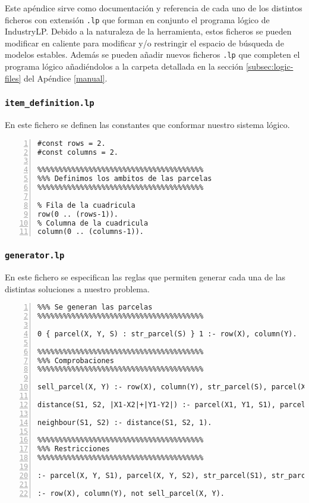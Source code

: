 Este apéndice sirve como documentación y referencia de cada uno de los distintos ficheros con extensión \texttt{.lp} que forman en conjunto el programa lógico de IndustryLP. Debido a la naturaleza de la herramienta, estos ficheros se pueden modificar en caliente para modificar y/o restringir el espacio de búsqueda de modelos estables. Además se pueden añadir nuevos ficheros \texttt{.lp} que completen el programa lógico añadiéndolos a la carpeta detallada en la sección \ref{subsec:logic-files} del Apéndice \ref{manual}.

\subsubsection{\large\texttt{item\_definition.lp}}

En este fichero se definen las constantes que conformar nuestro sistema lógico.

\begin{lstlisting}[basicstyle=\ttfamily, numberstyle={\color[rgb]{0.25, 0.25, 0.25}\ttfamily}, numbers=left]
#const rows = 2.
#const columns = 2.

%%%%%%%%%%%%%%%%%%%%%%%%%%%%%%%%%%%%%%%
%%% Definimos los ambitos de las parcelas
%%%%%%%%%%%%%%%%%%%%%%%%%%%%%%%%%%%%%%%

% Fila de la cuadricula
row(0 .. (rows-1)).
% Columna de la cuadricula
column(0 .. (columns-1)).
\end{lstlisting}

\subsubsection{\large\texttt{generator.lp}}

En este fichero se especifican las reglas que permiten generar cada una de las distintas soluciones a nuestro problema.

\begin{lstlisting}[basicstyle=\ttfamily, numberstyle={\color[rgb]{0.25, 0.25, 0.25}\ttfamily}, numbers=left]
%%%%%%%%%%%%%%%%%%%%%%%%%%%%%%%%%%%%%%%
%%% Se generan las parcelas
%%%%%%%%%%%%%%%%%%%%%%%%%%%%%%%%%%%%%%%

0 { parcel(X, Y, S) : str_parcel(S) } 1 :- row(X), column(Y).

%%%%%%%%%%%%%%%%%%%%%%%%%%%%%%%%%%%%%%%
%%% Comprobaciones
%%%%%%%%%%%%%%%%%%%%%%%%%%%%%%%%%%%%%%%

sell_parcel(X, Y) :- row(X), column(Y), str_parcel(S), parcel(X, Y, S).

distance(S1, S2, |X1-X2|+|Y1-Y2|) :- parcel(X1, Y1, S1), parcel(X2, Y2, S2), X1 != X2, Y1 != Y2.

neighbour(S1, S2) :- distance(S1, S2, 1).

%%%%%%%%%%%%%%%%%%%%%%%%%%%%%%%%%%%%%%%
%%% Restricciones
%%%%%%%%%%%%%%%%%%%%%%%%%%%%%%%%%%%%%%%

:- parcel(X, Y, S1), parcel(X, Y, S2), str_parcel(S1), str_parcel(S2), row(X), column(Y), S1 != S2.

:- row(X), column(Y), not sell_parcel(X, Y).
\end{lstlisting}

